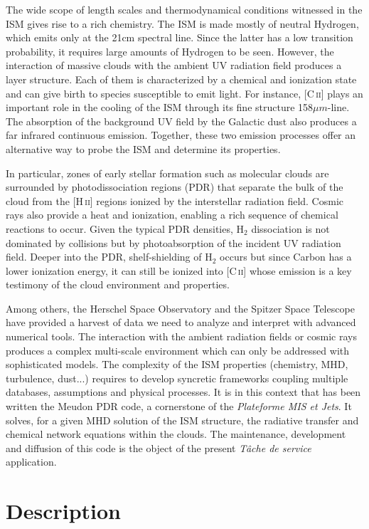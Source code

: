 \documentclass[a4paper,12pt,onecolumn]{article}
\makeatletter
\newcommand*{\cc}{[C\,\textsc{\lowercase{ii}}]\@\xspace}
\newcommand*{\hh}{[H\,\textsc{\lowercase{ii}}]\@\xspace}
\newcommand*{\hhm}{H$_{2}$\@\xspace}
\makeatother
\begin{document}
The wide scope of length scales and thermodynamical conditions witnessed in the ISM gives rise to a rich chemistry. The ISM is made mostly of neutral Hydrogen, which emits only at the 21cm spectral line. Since the latter has a low transition probability, it requires large amounts of Hydrogen to be seen. However, the interaction of massive clouds with the ambient UV radiation field produces a layer structure. Each of them is characterized by a chemical and ionization state and can give birth to species susceptible to emit light. For instance, \cc plays an important role in the cooling of the ISM through its fine structure 158$\mu m$-line. The absorption of the background UV field by the Galactic dust also produces a far infrared continuous emission. Together, these two emission processes offer an alternative way to probe the ISM and determine its properties. 

In particular, zones of early stellar formation such as molecular clouds are surrounded by photodissociation regions (PDR) that separate the bulk of the cloud from the \hh regions ionized by the interstellar radiation field. Cosmic rays also provide a heat and ionization, enabling a rich sequence of chemical reactions to occur. Given the typical PDR densities, \hhm dissociation is not dominated by collisions but by photoabsorption of the incident UV radiation field. Deeper into the PDR, shelf-shielding of \hhm occurs but since Carbon has a lower ionization energy, it can still be ionized into \cc whose emission is a key testimony of the cloud environment and properties.

Among others, the Herschel Space Observatory and the Spitzer Space Telescope have provided a harvest of data we need to analyze and interpret with advanced numerical tools. The interaction with the ambient radiation fields or cosmic rays produces a complex multi-scale environment which can only be addressed with sophisticated models. The complexity of the ISM properties (chemistry, MHD, turbulence, dust...) requires to develop syncretic frameworks coupling multiple databases, assumptions and physical processes. It is in this context that has been written the Meudon PDR code, a cornerstone of the \textit{Plateforme MIS et Jets}. It solves, for a given MHD solution of the ISM structure, the radiative transfer and chemical network equations within the clouds. The maintenance, development and diffusion of this code is the object of the present \textit{T\^{a}che de service} application.

\section*{Description}
\end{document}
